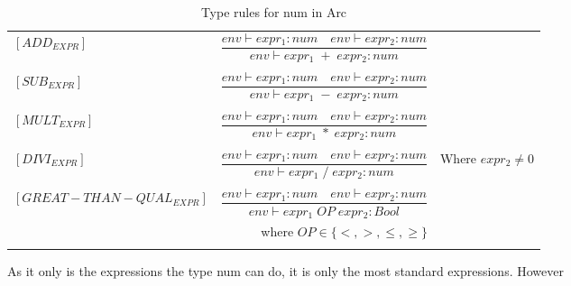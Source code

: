 \begin{table}[htb!]
    \centering
    \begin{tabular}{lr>{\raggedright\arraybackslash}p{6cm}}
        $[ADD_{EXPR}] $                         & $\dfrac
            {env\vdash expr_1: num \quad env\vdash expr_2: num}
            {env\vdash expr_1 \;+\;expr_2: num}$
        \\
        \\
        $[SUB_{EXPR}] $                         & $\dfrac
            {env\vdash expr_1: num \quad env\vdash expr_2: num}
            {env\vdash expr_1 \;-\;expr_2: num}$
        \\
        \\
        $[MULT_{EXPR}] $                        & $\dfrac
            {env\vdash expr_1: num \quad env\vdash expr_2: num}
            {env\vdash expr_1 \;*\;expr_2: num}$
        \\
        \\
        $[DIVI_{EXPR}] $                        & $\dfrac
            {env\vdash expr_1: num \quad env\vdash expr_2: num}
        {env\vdash expr_1 \; / \; expr_2: num}$ & Where $expr_2 \neq 0$
        \\
        \\
        $[GREAT-THAN-QUAL_{EXPR}] $             & $\dfrac
            {env\vdash expr_1: num \quad env\vdash expr_2: num}
            {env\vdash expr_1 \; OP \; expr_2: Bool}$                   \\ & where $OP \in \{<, >, \leq, \geq\}$

        \\
        \\
    \end{tabular}
    \caption{Type rules for num in Arc}
    \label{tab:num-rules}
\end{table}
As it only is the expressions the type num can do, it is only the most standard expressions.
However
